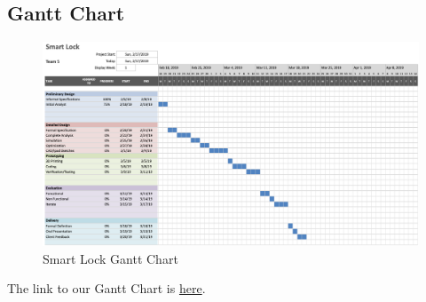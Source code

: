 
\subsection{Gantt Chart}

\begin{figure}[!ht]
    \centering
    \includegraphics[width=1 \linewidth]{./img/GanttChart.png}
    \caption{Smart Lock Gantt Chart}
    \label{fig:enter-label}
\end{figure}

The link to our Gantt Chart is \href{https://docs.google.com/spreadsheets/d/15-CQKq34XBjA4t8FiTcEjpkch6Mc3bLwerps_kKAucc/edit?usp=sharing}{here}.

